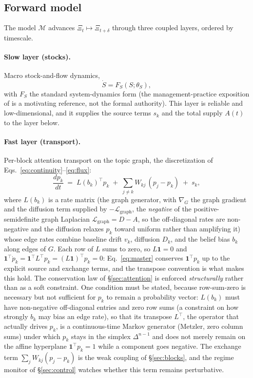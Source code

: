 \documentclass[11pt]{article}
\begin{document}
\subsection{Forward model}

The model $\mathcal{M}$ advances $\Xi_t \mapsto \Xi_{t+\delta}$ through three coupled layers, ordered by timescale.

\paragraph{Slow layer (stocks).} Macro stock-and-flow dynamics,
\begin{equation}
\dot S = F_S(S; \theta_S),
\end{equation}
with $F_S$ the standard system-dynamics form \cite{forrester1961,sterman2000} (the management-practice exposition of \cite{larson} is a motivating reference, not the formal authority). This layer is reliable and low-dimensional, and it supplies the source terms $s_k$ and the total supply $A(t)$ to the layer below.

\paragraph{Fast layer (transport).} Per-block attention transport on the topic graph, the discretization of Eqs.~\eqref{eq:continuity}--\eqref{eq:flux}:
\begin{equation}
\frac{d p_k}{dt} \;=\; L(b_k)^{\!\top} p_k \;+\; \sum_{j \neq k} W_{kj}\,(p_j - p_k) \;+\; s_k,
\label{eq:master}
\end{equation}
where $L(b_k)$ is a rate matrix (the graph generator, with $\nabla_G$ the graph gradient and the diffusion term supplied by $-\mathcal{L}_{\mathrm{graph}}$, the \emph{negative} of the positive-semidefinite graph Laplacian $\mathcal{L}_{\mathrm{graph}}=D-A$, so the off-diagonal rates are non-negative and the diffusion relaxes $p_k$ toward uniform rather than amplifying it) whose edge rates combine baseline drift $v_k$, diffusion $D_k$, and the belief bias $b_k$ along edges of $G$. Each row of $L$ sums to zero, so $L\mathbf{1}=0$ and $\mathbf{1}^\top \dot p_k = \mathbf{1}^\top L^\top p_k = (L\mathbf{1})^\top p_k = 0$: Eq.~\eqref{eq:master} conserves $\mathbf{1}^\top p_k$ up to the explicit source and exchange terms, and the transpose convention is what makes this hold. The conservation law of \S\ref{sec:attention} is enforced \emph{structurally} rather than as a soft constraint. One condition must be stated, because row-sum-zero is necessary but not sufficient for $p_k$ to remain a probability vector: $L(b_k)$ must have non-negative off-diagonal entries and zero row sums (a constraint on how strongly $b_k$ may bias an edge rate), so that its transpose $L^\top$, the operator that actually drives $p_k$, is a continuous-time Markov generator (Metzler, zero column sums) under which $p_k$ stays in the simplex $\Delta^{n-1}$ and does not merely remain on the affine hyperplane $\mathbf{1}^\top p_k = 1$ while a component goes negative. The exchange term $\sum_j W_{kj}(p_j-p_k)$ is the weak coupling of \S\ref{sec:blocks}, and the regime monitor of \S\ref{sec:control} watches whether this term remains perturbative.
\end{document}
